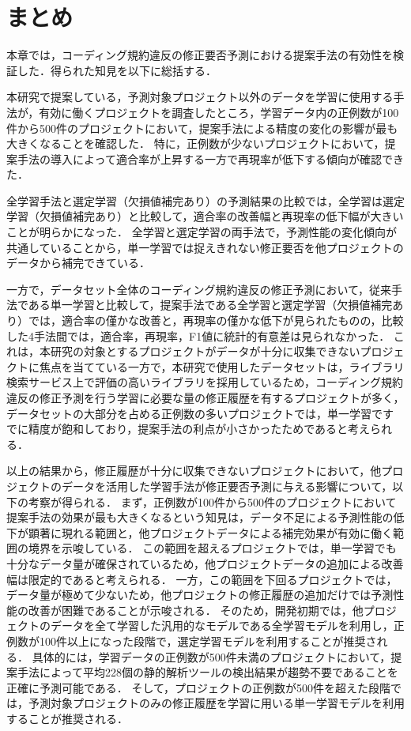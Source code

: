 \documentclass[11pt]{jreport}
\begin{document}


\section{まとめ}

本章では，コーディング規約違反の修正要否予測における提案手法の有効性を検証した．得られた知見を以下に総括する．

本研究で提案している，予測対象プロジェクト以外のデータを学習に使用する手法が，有効に働くプロジェクトを調査したところ，学習データ内の正例数が100件から500件のプロジェクトにおいて，提案手法による精度の変化の影響が最も大きくなることを確認した．
特に，正例数が少ないプロジェクトにおいて，提案手法の導入によって適合率が上昇する一方で再現率が低下する傾向が確認できた．

全学習手法と選定学習（欠損値補完あり）の予測結果の比較では，全学習は選定学習（欠損値補完あり）と比較して，適合率の改善幅と再現率の低下幅が大きいことが明らかになった．
全学習と選定学習の両手法で，予測性能の変化傾向が共通していることから，単一学習では捉えきれない修正要否を他プロジェクトのデータから補完できている．

一方で，データセット全体のコーディング規約違反の修正予測において，従来手法である単一学習と比較して，提案手法である全学習と選定学習（欠損値補完あり）では，適合率の僅かな改善と，再現率の僅かな低下が見られたものの，比較した4手法間では，適合率，再現率，F1値に統計的有意差は見られなかった．
これは，本研究の対象とするプロジェクトがデータが十分に収集できないプロジェクトに焦点を当てている一方で，本研究で使用したデータセットは，ライブラリ検索サービス上で評価の高いライブラリを採用しているため，コーディング規約違反の修正予測を行う学習に必要な量の修正履歴を有するプロジェクトが多く，データセットの大部分を占める正例数の多いプロジェクトでは，単一学習ですでに精度が飽和しており，提案手法の利点が小さかったためであると考えられる．

以上の結果から，修正履歴が十分に収集できないプロジェクトにおいて，他プロジェクトのデータを活用した学習手法が修正要否予測に与える影響について，以下の考察が得られる．
まず，正例数が100件から500件のプロジェクトにおいて提案手法の効果が最も大きくなるという知見は，データ不足による予測性能の低下が顕著に現れる範囲と，他プロジェクトデータによる補完効果が有効に働く範囲の境界を示唆している．
この範囲を超えるプロジェクトでは，単一学習でも十分なデータ量が確保されているため，他プロジェクトデータの追加による改善幅は限定的であると考えられる．
一方，この範囲を下回るプロジェクトでは，データ量が極めて少ないため，他プロジェクトの修正履歴の追加だけでは予測性能の改善が困難であることが示唆される．
そのため，開発初期では，他プロジェクトのデータを全て学習した汎用的なモデルである全学習モデルを利用し，正例数が100件以上になった段階で，選定学習モデルを利用することが推奨される．
具体的には，学習データの正例数が500件未満のプロジェクトにおいて，提案手法によって平均228個の静的解析ツールの検出結果が趨勢不要であることを正確に予測可能である．
そして，プロジェクトの正例数が500件を超えた段階では，予測対象プロジェクトのみの修正履歴を学習に用いる単一学習モデルを利用することが推奨される．
\end{document}
